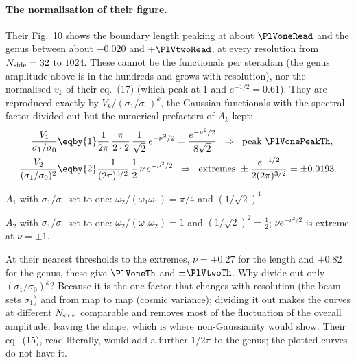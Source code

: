 \paragraph{The normalisation of their figure.} Their Fig.~10 shows the boundary length peaking at about
$\PlVoneRead$ and the genus between about $-0.020$ and $+\PlVtwoRead$, at every resolution from
$N_{\rm side}=32$ to $1024$. These cannot be the functionals per steradian (the genus amplitude above is in the
hundreds and grows with resolution), nor the normalised $v_k$ of their eq.~(17) (which peak at $1$ and
$e^{-1/2}=0.61$). They are reproduced exactly by $V_k/(\sigma_1/\sigma_0)^k$, the Gaussian functionals with the
spectral factor divided out but the numerical prefactors of $A_k$ kept:
\begin{align}
  \frac{V_1}{\sigma_1/\sigma_0}
  &\eqby{1}\frac{1}{2\pi}\,\frac{\pi}{2\cdot2}\,\frac{1}{\sqrt2}\,e^{-\nu^2/2}
   =\frac{e^{-\nu^2/2}}{8\sqrt2}\;\;\Rightarrow\;\;\text{peak }\PlVonePeakTh,
  \nonumber\\
  \frac{V_2}{(\sigma_1/\sigma_0)^2}
  &\eqby{2}\frac{1}{(2\pi)^{3/2}}\,\frac12\,\nu\,e^{-\nu^2/2}
   \;\;\Rightarrow\;\;\text{extremes }\pm\frac{e^{-1/2}}{2(2\pi)^{3/2}}=\pm0.0193 .
  \label{12a:eq:planck-norm}
\end{align}
\begin{explain}
  \item $A_1$ with $\sigma_1/\sigma_0$ set to one: $\omega_2/(\omega_1\omega_1)=\pi/4$ and
        $(1/\sqrt2)^1$.
  \item $A_2$ with $\sigma_1/\sigma_0$ set to one: $\omega_2/(\omega_0\omega_2)=1$ and $(1/\sqrt2)^2=\frac12$;
        $\nu e^{-\nu^2/2}$ is extreme at $\nu=\pm1$.
\end{explain}
At their nearest thresholds to the extremes, $\nu=\pm0.27$ for the length and $\pm0.82$ for the genus, these give
$\PlVoneTh$ and $\pm\PlVtwoTh$. Why divide out only $(\sigma_1/\sigma_0)^k$? Because it is the one factor that
changes with resolution (the beam sets $\sigma_1$) and from map to map (cosmic variance); dividing it out makes
the curves at different $N_{\rm side}$ comparable and removes most of the fluctuation of the overall amplitude,
leaving the shape, which is where non-Gaussianity would show. Their eq.~(15), read literally, would add a further
$1/2\pi$ to the genus; the plotted curves do not have it.

